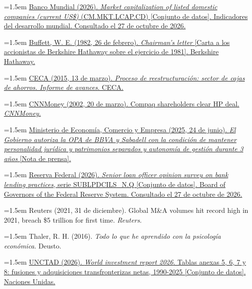 \documentclass[10pt,a4paper]{article}
\begin{document}
\noindent\hangindent=1.5em \href{https://data.worldbank.org/indicator/CM.MKT.LCAP.CD}{Banco Mundial (2026). \textit{Market capitalization of listed domestic companies (current US\$)} (CM.MKT.LCAP.CD) [Conjunto de datos]. Indicadores del desarrollo mundial. Consultado el 27 de octubre de 2026.}

\noindent\hangindent=1.5em \href{https://www.berkshirehathaway.com/letters/1981.html}{Buffett, W. E. (1982, 26 de febrero). \textit{Chairman's letter} [Carta a los accionistas de Berkshire Hathaway sobre el ejercicio de 1981]. Berkshire Hathaway.}

\noindent\hangindent=1.5em \href{https://www.ceca.es/wp-content/uploads/2021/07/Reestructuracion-13-3-2015.pdf}{CECA (2015, 13 de marzo). \textit{Proceso de reestructuración: sector de cajas de ahorros. Informe de avances}. CECA.}

\noindent\hangindent=1.5em \href{https://money.cnn.com/2002/03/20/news/deals/compaq/index.htm}{CNNMoney (2002, 20 de marzo). Compaq shareholders clear HP deal. \textit{CNNMoney}.}

\noindent\hangindent=1.5em \href{https://portal.mineco.gob.es/es-es/comunicacion/Paginas/OPA.aspx}{Ministerio de Economía, Comercio y Empresa (2025, 24 de junio). \textit{El Gobierno autoriza la OPA de BBVA y Sabadell con la condición de mantener personalidad jurídica y patrimonios separados y autonomía de gestión durante 3 años} [Nota de prensa].}

\noindent\hangindent=1.5em \href{https://www.federalreserve.gov/data/sloos.htm}{Reserva Federal (2026). \textit{Senior loan officer opinion survey on bank lending practices}, serie SUBLPDCILS\_N.Q [Conjunto de datos]. Board of Governors of the Federal Reserve System. Consultado el 27 de octubre de 2026.}

\noindent\hangindent=1.5em Reuters (2021, 31 de diciembre). Global M\&A volumes hit record high in 2021, breach \$5 trillion for first time. \textit{Reuters}.

\noindent\hangindent=1.5em Thaler, R. H. (2016). \textit{Todo lo que he aprendido con la psicología económica}. Deusto.

\noindent\hangindent=1.5em \href{https://unctad.org/topic/investment/world-investment-report}{UNCTAD (2026). \textit{World investment report 2026}. Tablas anexas 5, 6, 7 y 8: fusiones y adquisiciones transfronterizas netas, 1990-2025 [Conjunto de datos]. Naciones Unidas.}
\end{document}
